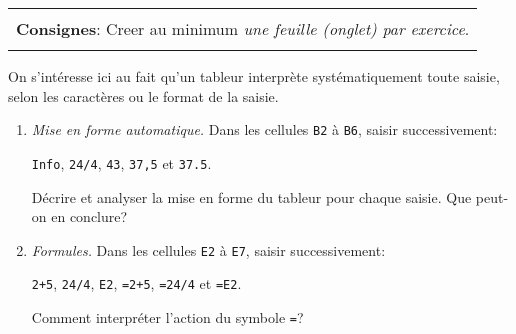 \documentclass[a4paper, twoside, 11pt]{article}
\author{D. Fourer, L. Lagon (merci \`a S. Cartier)}
\begin{document}
\maketitle{}

\begin{center}
  \begin{tabular}{|@{\qquad}c@{\qquad}|}
  \hline
  \\
  \begin{minipage}{0.8\linewidth}
    \textbf{Consignes}: %
    Creer au minimum \emph{une feuille (onglet) par exercice}.
  \end{minipage} \\
  \\
  \hline
  \end{tabular}
\end{center}
\medskip

\begin{exercise}
  On s'intéresse ici au fait qu'un tableur interprète systématiquement toute saisie, selon les caractères ou le format de la saisie.
  \begin{enumerate}
    \item \textit{Mise en forme automatique.} Dans les cellules \verb+B2+ à \verb+B6+, saisir successivement:
    \begin{center}
      \verb+Info+, \quad \verb+24/4+, \quad \verb+43+, \quad \verb+37,5+ \quad et \quad \verb+37.5+.
    \end{center}
    Décrire et analyser la mise en forme du tableur pour chaque saisie. Que peut-on en conclure?
    \item \textit{Formules.} Dans les cellules \verb+E2+ à \verb+E7+, saisir successivement:
    \begin{center}
      \verb-2+5-, \quad \verb+24/4+, \quad \verb+E2+, \quad \verb-=2+5-, \quad \verb+=24/4+ \quad et \quad \verb+=E2+.
    \end{center}
    Comment interpréter l'action du symbole \verb+=+?
  \end{enumerate}
\end{exercise}
\end{document}

